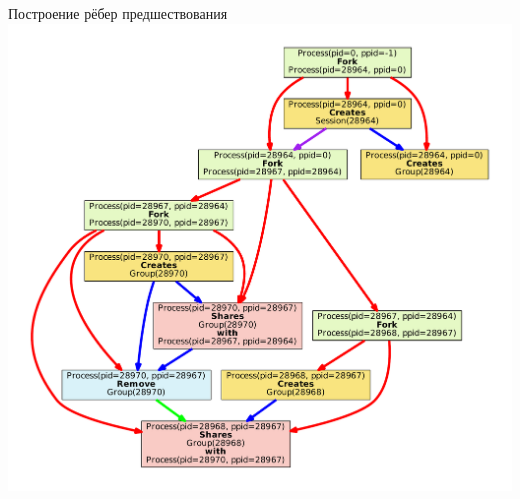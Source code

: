 \begin{frame}{Построение рёбер предшествования}
\centering
\includegraphics[scale=0.3]{fig/simpleGroupsGraphEdges.pdf}
\end{frame}

